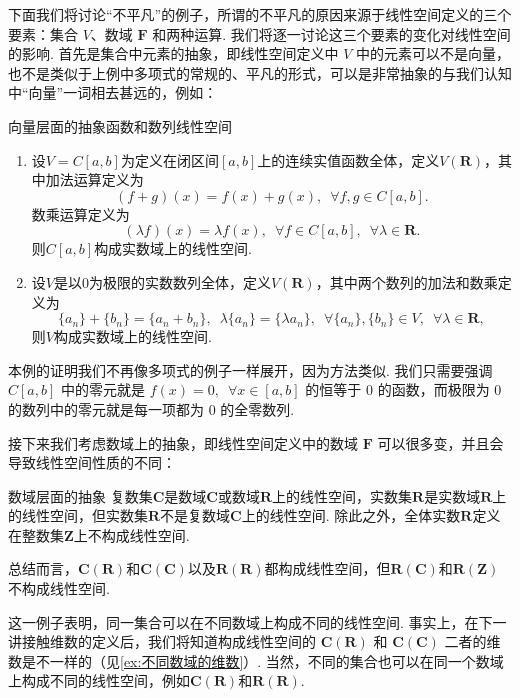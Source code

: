 下面我们将讨论``不平凡''的例子，所谓的不平凡的原因来源于线性空间定义的三个要素：集合 $V$、数域 $\mathbf{F}$ 和两种运算. 我们将逐一讨论这三个要素的变化对线性空间的影响. 首先是集合中元素的抽象，即线性空间定义中 $V$ 中的元素可以不是向量，也不是类似于上例中多项式的常规的、平凡的形式，可以是非常抽象的与我们认知中``向量''一词相去甚远的，例如：
\begin{example}{向量层面的抽象}{函数和数列线性空间}
    \begin{enumerate}
        \item 设$V=C[a,b]$为定义在闭区间$[a,b]$上的连续实值函数全体，定义$V(\mathbf{R})$，其中加法运算定义为
              \[(f+g)(x)=f(x)+g(x),\enspace\forall f,g\in C[a,b].\]
              数乘运算定义为
              \[(\lambda f)(x)=\lambda f(x),\enspace\forall f\in C[a,b],\enspace\forall \lambda\in\mathbf{R}.\]
              则$C[a,b]$构成实数域上的线性空间.

        \item 设$V$是以$0$为极限的实数数列全体，定义$V(\mathbf{R})$，其中两个数列的加法和数乘定义为
              \[\{a_n\}+\{b_n\}=\{a_n+b_n\},\enspace\lambda\{a_n\}=\{\lambda a_n\},\enspace\forall \{a_n\},\{b_n\}\in V,\enspace\forall \lambda\in\mathbf{R},\]
              则$V$构成实数域上的线性空间.
    \end{enumerate}
\end{example}

本例的证明我们不再像多项式的例子一样展开，因为方法类似. 我们只需要强调 $C[a,b]$ 中的零元就是 $f(x) = 0, \enspace \forall x \in [a,b]$ 的恒等于 $0$ 的函数，而极限为 $0$ 的数列中的零元就是每一项都为 $0$ 的全零数列.

接下来我们考虑数域上的抽象，即线性空间定义中的数域 $\mathbf{F}$ 可以很多变，并且会导致线性空间性质的不同：
\begin{example}{数域层面的抽象}{}
    复数集$\mathbf{C}$是数域$\mathbf{C}$或数域$\mathbf{R}$上的线性空间，实数集$\mathbf{R}$是实数域$\mathbf{R}$上的线性空间，但实数集$\mathbf{R}$不是复数域$\mathbf{C}$上的线性空间. 除此之外，全体实数$\mathbf{R}$定义在整数集$\mathbf{Z}$上不构成线性空间.

    总结而言，$\mathbf{C}(\mathbf{R})$和$\mathbf{C}(\mathbf{C})$以及$\mathbf{R(R)}$都构成线性空间，但$\mathbf{R}(\mathbf{C})$和$\mathbf{R}(\mathbf{Z})$不构成线性空间.
\end{example}

这一例子表明，同一集合可以在不同数域上构成不同的线性空间. 事实上，在下一讲接触维数的定义后，我们将知道构成线性空间的 $\mathbf{C}(\mathbf{R})$ 和 $\mathbf{C}(\mathbf{C})$ 二者的维数是不一样的（见\autoref{ex:不同数域的维数}）. 当然，不同的集合也可以在同一个数域上构成不同的线性空间，例如$\mathbf{C(R)}$和$\mathbf{R(R)}$.

